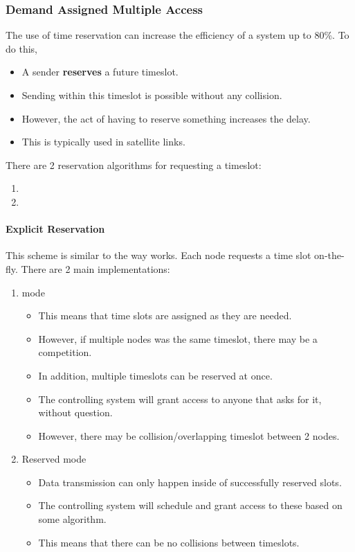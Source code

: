 \subsubsection{Demand Assigned Multiple Access}\label{subsubsec:DAMA}
The use of time reservation can increase the efficiency of a system up to 80\%.
To do this,
\begin{itemize}[noitemsep]
\item A sender \textbf{reserves} a future timeslot.
\item Sending within this timeslot is possible without any collision.
\item However, the act of having to reserve something increases the delay.
\item This is typically used in satellite links.
\end{itemize}

There are 2 reservation algorithms for requesting a timeslot:
\begin{enumerate}[noitemsep]
\item {}
\item {}
\end{enumerate}

\paragraph{Explicit Reservation}\label{par:TDMA_Explicit_Reservation}
This scheme is similar to the way  works.
Each node requests a time slot on-the-fly.
There are 2 main implementations:
\begin{enumerate}[noitemsep]
\item {} mode
  \begin{itemize}[noitemsep]
  \item This means that time slots are assigned as they are needed.
  \item However, if multiple nodes was the same timeslot, there may be a competition.
  \item In addition, multiple timeslots can be reserved at once.
  \item The controlling system will grant access to anyone that asks for it, without question.
  \item However, there may be collision/overlapping timeslot between 2 nodes.
  \end{itemize}

\item Reserved mode
  \begin{itemize}[noitemsep]
  \item Data transmission can only happen inside of successfully reserved slots.
  \item The controlling system will schedule and grant access to these based on some algorithm.
  \item This means that there can be no collisions between timeslots.
  \end{itemize}
\end{enumerate}


